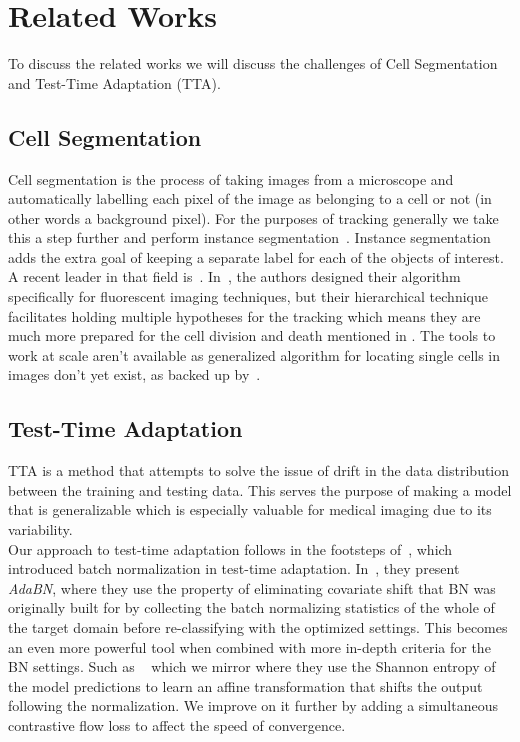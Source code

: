 \section{Related Works}
\label{sec:RW}
To discuss the related works we will discuss the challenges of Cell Segmentation and Test-Time Adaptation (TTA).

\subsection{Cell Segmentation}

Cell segmentation is the process of taking images from a microscope and automatically labelling each pixel of the image as belonging to a cell or not (in other words a background pixel).  For the purposes of tracking generally we take this a step further and perform instance segmentation~\cite{Yang_2019_ICCV}.  Instance segmentation adds the extra goal of keeping a separate label for each of the objects of interest.  \\ 

A recent leader in that field is~\cite{bragantini2024ucmtracking}.  In~\cite{bragantini2024ucmtracking}, the authors designed their algorithm specifically for fluorescent imaging techniques, but their hierarchical technique facilitates holding multiple hypotheses for the tracking which means they are much more prepared for the cell division and death mentioned in .  The tools to work at scale aren't available as generalized algorithm for locating  single cells in images don't yet exist, as backed up by~\cite{greenwald2022whole}.


\subsection{Test-Time Adaptation}
\label{sec:TTARW}

TTA is a method that attempts to solve the issue of drift in the data distribution between the training and testing data. This serves the purpose of making a model that is generalizable which is especially valuable for medical imaging due to its variability. 
\\

Our approach to test-time adaptation follows in the footsteps of~\cite{Li2018-el}, which introduced batch normalization in test-time adaptation. In~\cite{Li2018-el}, they present \textit{AdaBN}, where they use the property of eliminating covariate shift that BN was originally built for by collecting the batch normalizing statistics of the whole of the target domain before re-classifying with the optimized settings.  This becomes an even more powerful tool when combined with more in-depth criteria for the BN settings.  Such as ~\cite{wang2020tent} which we mirror where they use the Shannon entropy of the model predictions to learn an affine transformation that shifts the output following the normalization.  We improve on it further by adding a simultaneous contrastive flow loss to affect the speed of convergence.\\


